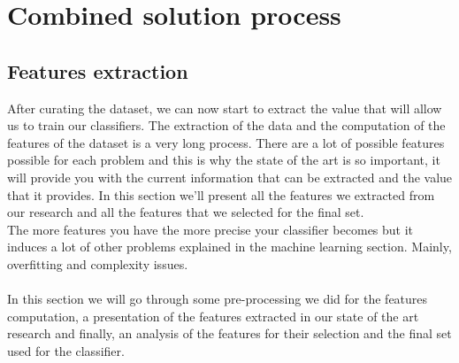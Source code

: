 
\chapter{Combined solution process} 
\label{Combined solution process}

\section{Features extraction}
After curating the dataset, we can now start to extract the value that will allow us to train our classifiers. The extraction of the data and the computation of the features of the dataset is a very long process. There are a lot of possible features possible for each problem and this is why the state of the art is so important, it will provide you with the current information that can be extracted and the value that it provides. In this section we'll present all the features we extracted from our research and all the features that we selected for the final set. \\
The more features you have the more precise your classifier becomes but it induces a lot of other problems explained in the machine learning section. Mainly, overfitting and complexity issues.\\\\
In this section we will go through some pre-processing we did for the features computation, a presentation of the features extracted in our state of the art research and finally, an analysis of the features for their selection and the final set used for the classifier.

